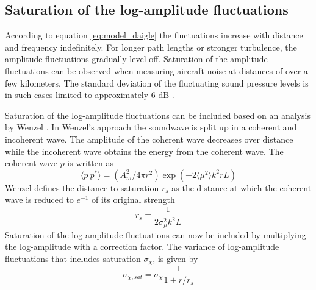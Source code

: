 \subsection{Saturation of the log-amplitude fluctuations}
According to equation \eqref{eq:model_daigle} the fluctuations increase with distance and frequency indefinitely.
For longer path lengths or stronger turbulence, the amplitude fluctuations
gradually level off. Saturation of the amplitude fluctuations can be observed
when measuring aircraft noise at distances of over a few kilometers. The
standard deviation of the fluctuating sound pressure levels is in such cases
limited to approximately 6 dB \cite{Daigle1983}.

Saturation of the log-amplitude fluctuations can be included based on an analysis by Wenzel
\cite{Wenzel1975}. In Wenzel's approach the soundwave is split up in a coherent
and incoherent wave. The amplitude of the coherent wave decreases over distance
while the incoherent wave obtains the energy from the coherent wave. The
coherent wave $p$ is written as
\begin{equation}
 \langle p \  p^* \rangle = \left( A_m^2 / 4 \pi r^2 \right) \exp{\left( -2 \langle \mu^2 \rangle k^2 r L \right)}
\end{equation}
Wenzel defines the distance to saturation $r_s$ as the distance at which the coherent wave is reduced to $e^{-1}$ of its original strength
\begin{equation}\label{eq:saturation_distance}
 r_s = \frac{1}{2 \sigma_{\mu}^2 k^2 L}
\end{equation}
Saturation of the log-amplitude fluctuations can now be included by multiplying the log-amplitude with a correction factor.
The variance of log-amplitude fluctuations that includes saturation $\sigma_{\chi}$, is given by
\begin{equation}\label{eq:saturation_logamp}
 \sigma_{\chi, sat} = \sigma_{\chi} \frac{ 1}{1 + r/r_s}
\end{equation}

